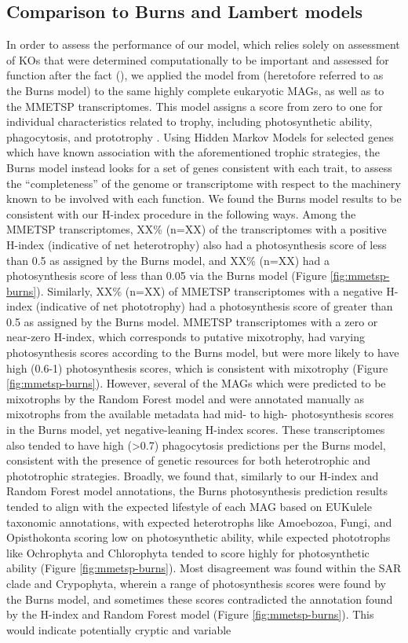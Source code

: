 \documentclass[12pt]{article}
\numberwithin{equation}{section}
\begin{document}
\subsection{Comparison to Burns and Lambert models}\label{burnssec}
In order to assess the performance of our model, which relies solely on assessment of KOs \citep{Kanehisa_2019} that were determined computationally to be important and assessed for function after the fact (), we applied the model from \cite{burns2018gene} (heretofore referred to as the Burns model) to the same highly complete eukaryotic MAGs, as well as to the MMETSP transcriptomes. This model assigns a score from zero to one for individual characteristics related to trophy, including photosynthetic ability, phagocytosis, and prototrophy \citep{burns2018gene}. Using Hidden Markov Models for selected genes which have known association with the aforementioned trophic strategies, the Burns model instead looks for a set of genes consistent with each trait, to assess the ``completeness'' of the genome or transcriptome with respect to the machinery known to be involved with each function. We found the Burns model results to be consistent with our H-index procedure in the following ways. Among the MMETSP transcriptomes, XX\% (n=XX) of the transcriptomes with a positive H-index (indicative of net heterotrophy) also had a photosynthesis score of less than 0.5 as assigned by the Burns model, and XX\% (n=XX) had a photosynthesis score of less than 0.05 via the Burns model (Figure \ref{fig:mmetsp-burns}). Similarly, XX\% (n=XX)  of MMETSP transcriptomes with a negative H-index (indicative of net phototrophy) had a photosynthesis score of greater than 0.5 as assigned by the Burns model. MMETSP transcriptomes with a zero or near-zero H-index, which corresponds to putative mixotrophy, had varying photosynthesis scores according to the Burns model, but were more likely to have high (0.6-1) photosynthesis scores, which is consistent with mixotrophy (Figure \ref{fig:mmetsp-burns}). However, several of the MAGs which were predicted to be mixotrophs by the Random Forest model and were annotated manually as mixotrophs from the available metadata had mid- to high- photosynthesis scores in the Burns model, yet negative-leaning H-index scores. These transcriptomes also tended to have high (>0.7) phagocytosis predictions per the Burns model, consistent with the presence of genetic resources for both heterotrophic and phototrophic strategies. Broadly, we found that, similarly to our H-index and Random Forest model annotations, the Burns photosynthesis prediction results tended to align with the expected lifestyle of each MAG based on EUKulele \citep{Krinos2021EUKulele} taxonomic annotations, with expected heterotrophs like Amoebozoa, Fungi, and Opisthokonta scoring low on photosynthetic ability, while expected phototrophs like Ochrophyta and Chlorophyta tended to score highly for photosynthetic ability (Figure \ref{fig:mmetsp-burns}). Most disagreement was found within the SAR clade and Crypophyta, wherein a range of photosynthesis scores were found by the Burns model, and sometimes these scores contradicted the annotation found by the H-index and Random Forest model (Figure \ref{fig:mmetsp-burns}). This would indicate potentially cryptic and variable 
\end{document}
